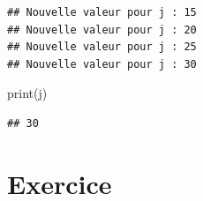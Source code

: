 \documentclass[
  12pt,
]{book}
\newenvironment{Shaded}{\begin{snugshade}}{\end{snugshade}}
\newcommand{\BuiltInTok}[1]{#1}
\newcommand{\NormalTok}[1]{#1}
\numberwithin{equation}{section}
\numberwithin{countremarque}{section}
\begin{document}
\begin{lstlisting}
## Nouvelle valeur pour j : 15
## Nouvelle valeur pour j : 20
## Nouvelle valeur pour j : 25
## Nouvelle valeur pour j : 30
\end{lstlisting}

\begin{Shaded}
\begin{Highlighting}[]
  
\BuiltInTok{print}\NormalTok{(j)}
\end{Highlighting}
\end{Shaded}

\begin{lstlisting}
## 30
\end{lstlisting}

\section{Exercice}\label{exercice-5}
\end{document}
